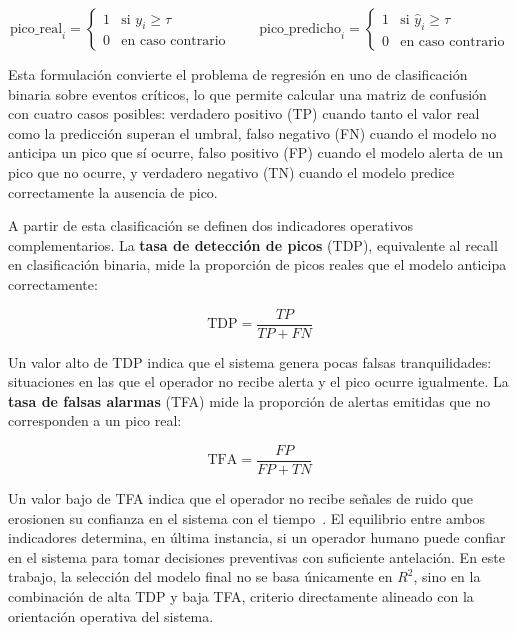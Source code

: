\documentclass[12pt, a4paper]{article}
\begin{document}
\begin{equation}
\text{pico\_real}_i = \begin{cases} 1 & \text{si } y_i \geq \tau \\ 0 & \text{en caso contrario} \end{cases} \qquad \text{pico\_predicho}_i = \begin{cases} 1 & \text{si } \hat{y}_i \geq \tau \\ 0 & \text{en caso contrario} \end{cases}
\end{equation}

Esta formulación convierte el problema de regresión en uno de clasificación binaria sobre eventos críticos, lo que permite calcular una matriz de confusión con cuatro casos posibles: verdadero positivo (TP) cuando tanto el valor real como la predicción superan el umbral, falso negativo (FN) cuando el modelo no anticipa un pico que sí ocurre, falso positivo (FP) cuando el modelo alerta de un pico que no ocurre, y verdadero negativo (TN) cuando el modelo predice correctamente la ausencia de pico.

A partir de esta clasificación se definen dos indicadores operativos complementarios. La \textbf{tasa de detección de picos} (TDP), equivalente al recall en clasificación binaria, mide la proporción de picos reales que el modelo anticipa correctamente:

\begin{equation}
\text{TDP} = \frac{TP}{TP + FN}
\end{equation}

Un valor alto de TDP indica que el sistema genera pocas falsas tranquilidades: situaciones en las que el operador no recibe alerta y el pico ocurre igualmente. La \textbf{tasa de falsas alarmas} (TFA) mide la proporción de alertas emitidas que no corresponden a un pico real:

\begin{equation}
\text{TFA} = \frac{FP}{FP + TN}
\end{equation}

Un valor bajo de TFA indica que el operador no recibe señales de ruido que erosionen su confianza en el sistema con el tiempo~\cite{maridelolmo2022, yasuhiro2020}. El equilibrio entre ambos indicadores determina, en última instancia, si un operador humano puede confiar en el sistema para tomar decisiones preventivas con suficiente antelación. En este trabajo, la selección del modelo final no se basa únicamente en $R^2$, sino en la combinación de alta TDP y baja TFA, criterio directamente alineado con la orientación operativa del sistema.
\end{document}
